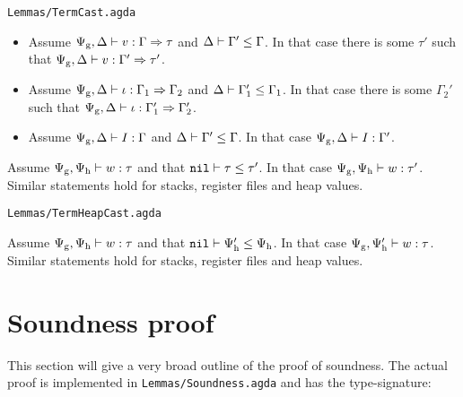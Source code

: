 \texttt{Lemmas/TermCast.agda}
\begin{lemma}
  \label{lemma:evaluatin-casting}
  \begin{itemize}
  \item Assume ${\Psi_{\mathrm{g}},\Delta} |- {v} : {\Gamma => \tau}$
    and ${\Delta} |- {\Gamma'} \le {\Gamma}$. In that case there is some
    $\tau'$ such that
    ${\Psi_{\mathrm{g}},\Delta} |- {v} : {\Gamma' => \tau'}$.

  \item Assume ${\Psi_{\mathrm{g}},\Delta} |- {\iota} : {\Gamma_1 => \Gamma_2}$
    and ${\Delta} |- {\Gamma_1'} \le {\Gamma_1}$. In that case there is some
    $\Gamma_2'$ such that
    ${\Psi_{\mathrm{g}},\Delta} |- {\iota} : {\Gamma_1' => \Gamma_2'}$.

  \item Assume ${\Psi_{\mathrm{g}},\Delta} |- {I} : {\Gamma}$ and
    ${\Delta} |- {\Gamma'} \le {\Gamma}$. In that case
    ${\Psi_{\mathrm{g}},\Delta} |- {I} : {\Gamma'}$.
  \end{itemize}
\end{lemma}

\begin{lemma}
  \label{lemma:value-casting}
  Assume ${\Psi_{\mathrm{g}},\Psi_{\mathrm{h}}} |- {w} : {\tau}$ and that
  ${\mathtt{nil}} |- {\tau} \le {\tau'}$. In that case
  ${\Psi_{\mathrm{g}},\Psi_{\mathrm{h}}} |- {w} : {\tau'}$. Similar
  statements hold for stacks, register files and heap values.
\end{lemma}

\texttt{Lemmas/TermHeapCast.agda}
\begin{lemma}
  \label{lemma:heap-casting}
  Assume ${\Psi_{\mathrm{g}},\Psi_{\mathrm{h}}} |- {w} : {\tau}$ and that
  ${\mathtt{nil}} |- {\Psi_{\mathrm{h}}'} \le {\Psi_{\mathrm{h}}}$. In that case
  ${\Psi_{\mathrm{g}},\Psi_{\mathrm{h}}'} |- {w} : {\tau}$. Similar
  statements hold for stacks, register files and heap values.
\end{lemma}

\section{Soundness proof}

This section will give a very broad outline of the proof of soundness. The
actual proof is implemented in \texttt{Lemmas/Soundness.agda} and has the
type-signature:

